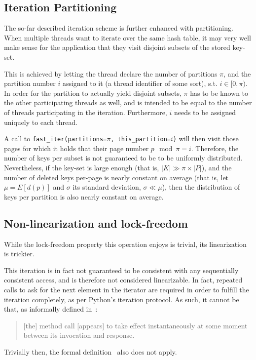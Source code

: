 \subsection{Iteration Partitioning}\label{subsec:iteration-partitioning}

The so-far described iteration scheme is further enhanced with partitioning.
When multiple threads want to iterate over the same hash table, it may very well make sense for the application that they visit disjoint subsets of the stored key-set.

This is achieved by letting the thread declare the number of partitions $\pi$, and the partition number $i$ assigned to it (a thread identifier of some sort), s.t. $i \in [0, \pi)$.
In order for the partition to actually yield disjoint subsets, $\pi$ has to be known to the other participating threads as well, and is intended to be equal to the number of threads participating in the iteration.
Furthermore, $i$ needs to be assigned uniquely to each thread.

A call to \texttt{{fast\_iter(partitions=$\pi$, this\_partition=$i$)}} will then visit those pages for which it holds that their page number $p \mod \pi = i$.
Therefore, the number of keys per subset is not guaranteed to be to be uniformly distributed.
Nevertheless, if the key-set is large enough (that is, $|K| \gg \pi \times |P|$), and the number of deleted keys per-page is nearly constant on average (that is, let $\mu = E[d(p)]$ and $\sigma$ its standard deviation, $\sigma \ll \mu$), then the distribution of keys per partition is also nearly constant on average.


\subsection{Non-linearization and lock-freedom}\label{subsec:iteration-linearization-lock-freedom}
While the lock-freedom property this operation enjoys is trivial, its linearization is trickier.

This iteration is in fact not guaranteed to be consistent with any sequentially consistent access, and is therefore not considered linearizable.
In fact, repeated calls to ask for the next element in the iterator are required in order to fulfill the iteration completely, as per Python's iteration protocol.
As such, it cannot be that, as informally defined in~\cite[Principle~3.5.1]{art-mp}:
\begin{quote}
	[the] method call [appears] to take effect instantaneously at some moment between its invocation and response.
\end{quote}
Trivially then, the formal definition~\cite[Definition~3.6.1]{art-mp} also does not apply.

